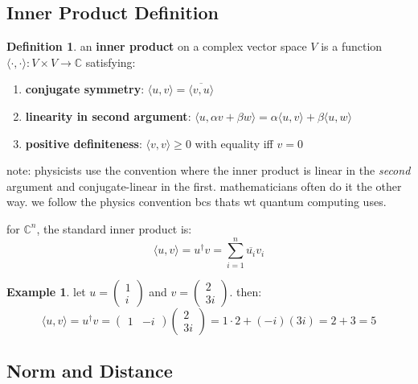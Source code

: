 \documentclass[11pt,a4paper]{article}
\theoremstyle{definition}
\newtheorem{definition}{Definition}[section]
\newtheorem{example}{Example}[section]
\theoremstyle{remark}
\begin{document}
\subsection{Inner Product Definition}

\begin{definition}
an \textbf{inner product} on a complex vector space $V$ is a function $\langle \cdot, \cdot \rangle: V \times V \to \mathbb{C}$ satisfying:
\begin{enumerate}[label=(\roman*)]
    \item \textbf{conjugate symmetry}: $\langle u, v \rangle = \overline{\langle v, u \rangle}$
    \item \textbf{linearity in second argument}: $\langle u, \alpha v + \beta w \rangle = \alpha \langle u, v \rangle + \beta \langle u, w \rangle$
    \item \textbf{positive definiteness}: $\langle v, v \rangle \geq 0$ with equality iff $v = 0$
\end{enumerate}
\end{definition}

note: physicists use the convention where the inner product is linear in the \textit{second} argument and conjugate-linear in the first. mathematicians often do it the other way. we follow the physics convention bcs thats wt quantum computing uses.

for $\mathbb{C}^n$, the standard inner product is:
\[
\boxed{\langle u, v \rangle = u^\dagger v = \sum_{i=1}^{n} \overline{u_i} v_i}
\]

\begin{example}
let $u = \begin{pmatrix} 1 \\ i \end{pmatrix}$ and $v = \begin{pmatrix} 2 \\ 3i \end{pmatrix}$. then:
\[
\langle u, v \rangle = u^\dagger v = \begin{pmatrix} 1 & -i \end{pmatrix} \begin{pmatrix} 2 \\ 3i \end{pmatrix} = 1 \cdot 2 + (-i)(3i) = 2 + 3 = 5
\]
\end{example}

\subsection{Norm and Distance}
\end{document}
